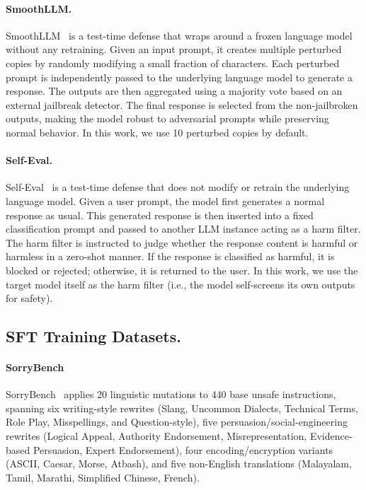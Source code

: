\documentclass[11pt, letterpaper]{template}
\theoremstyle{plain}
\theoremstyle{definition}
\theoremstyle{remark}
\begin{document}
\paragraph{SmoothLLM.}
SmoothLLM~\citep{robey2023smoothllm} is a test-time defense that wraps around a frozen language model without any retraining.
Given an input prompt, it creates multiple perturbed copies by randomly modifying a small fraction of characters. Each perturbed prompt is independently passed to the underlying language model to generate a response. The outputs are then aggregated using a majority vote based on an external jailbreak detector. The final response is selected from the non-jailbroken outputs, making the model robust to adversarial prompts while preserving normal behavior.  In this work, we use 10 perturbed copies by default.

\paragraph{Self-Eval.}
Self-Eval~\citep{phute2023llm} is a test-time defense that does not modify or retrain the underlying language model.
Given a user prompt, the model first generates a normal response as usual. This generated response is then inserted into a fixed classification prompt and passed to another LLM instance acting as a harm filter. The harm filter is instructed to judge whether the response content is harmful or harmless in a zero-shot manner. If the response is classified as harmful, it is blocked or rejected; otherwise, it is returned to the user. In this work, we use the target model itself as the harm filter (i.e., the model self-screens its own outputs for safety).

\subsection{SFT Training Datasets.}
\paragraph{SorryBench} SorryBench~\citep{xie2024sorry} applies 20 linguistic mutations to 440 base unsafe instructions, spanning six writing-style rewrites (Slang, Uncommon Dialects, Technical Terms, Role Play, Misspellings, and Question-style), five persuasion/social-engineering rewrites (Logical Appeal, Authority Endorsement, Misrepresentation, Evidence-based Persuasion, Expert Endorsement), four encoding/encryption variants (ASCII, Caesar, Morse, Atbash), and five non-English translations (Malayalam, Tamil, Marathi, Simplified Chinese, French). 
\end{document}
